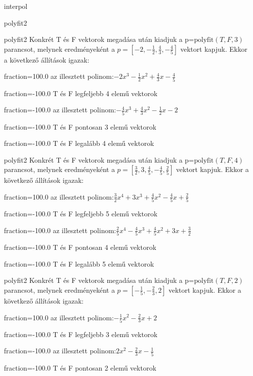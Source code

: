 \documentclass[12pt]{article}
\begin{document}
\begin{quiz}{interpol}
\begin{multi}[multiple]{polyfit2}
\end{multi}
\begin{multi}[multiple]{polyfit2}
Konkrét T és F vektorok megadása után kiadjuk a p=$\mathrm{polyfit}(T,F,3)$
parancsot, melynek eredményeként a $p=\left[-2,-\frac{1}{2},\frac{4}{3},-\frac{4}{5}\right]$ vektort kapjuk.
Ekkor a következő állítások igazak:
\item[fraction=100.0] az illesztett polinom:$-2x^3-\frac{1}{2}x^2+\frac{4}{3}x-\frac{4}{5}$
\item[fraction=-100.0]  T és F legfeljebb 4 elemű vektorok
\item[fraction=-100.0]  az illesztett polinom:$-\frac{4}{5}x^3+\frac{4}{3}x^2-\frac{1}{2}x-2$
\item[fraction=-100.0]  T és F pontosan 3 elemű vektorok
\item[fraction=-100.0] T és F legalább 4 elemű vektorok
\end{multi}
\begin{multi}[multiple]{polyfit2}
Konkrét T és F vektorok megadása után kiadjuk a p=$\mathrm{polyfit}(T,F,4)$
parancsot, melynek eredményeként a $p=\left[\frac{3}{2},3,\frac{4}{5},-\frac{4}{5},\frac{2}{5}\right]$ vektort kapjuk.
Ekkor a következő állítások igazak:
\item[fraction=100.0] az illesztett polinom:$\frac{3}{2}x^4+3x^3+\frac{4}{5}x^2-\frac{4}{5}x+\frac{2}{5}$
\item[fraction=-100.0]  T és F legfeljebb 5 elemű vektorok
\item[fraction=-100.0]  az illesztett polinom:$\frac{2}{5}x^4-\frac{4}{5}x^3+\frac{4}{5}x^2+3x+\frac{3}{2}$
\item[fraction=-100.0]  T és F pontosan 4 elemű vektorok
\item[fraction=-100.0] T és F legalább 5 elemű vektorok
\end{multi}
\begin{multi}[multiple]{polyfit2}
Konkrét T és F vektorok megadása után kiadjuk a p=$\mathrm{polyfit}(T,F,2)$
parancsot, melynek eredményeként a $p=\left[-\frac{1}{5},-\frac{2}{3},2\right]$ vektort kapjuk.
Ekkor a következő állítások igazak:
\item[fraction=100.0] az illesztett polinom:$-\frac{1}{5}x^2-\frac{2}{3}x+2$
\item[fraction=-100.0]  T és F legfeljebb 3 elemű vektorok
\item[fraction=-100.0]  az illesztett polinom:$2x^2-\frac{2}{3}x-\frac{1}{5}$
\item[fraction=-100.0]  T és F pontosan 2 elemű vektorok

\end{multi}
\end{quiz}
\end{document}
